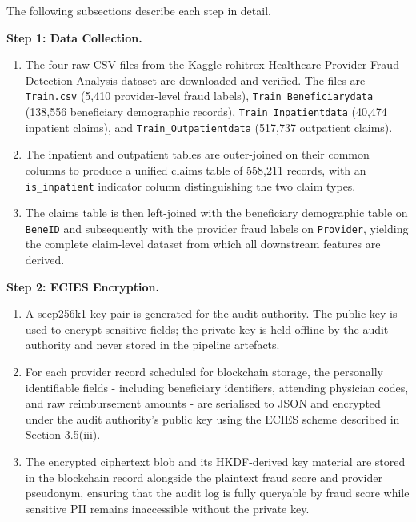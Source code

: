\noindent The following subsections describe each step in detail.

\vspace{0.5em}
\noindent\textbf{Step 1: Data Collection.}

\begin{enumerate}[label=\roman*.]
  \item The four raw CSV files from the Kaggle rohitrox Healthcare Provider Fraud
  Detection Analysis dataset are downloaded and verified. The files are
  \texttt{Train.csv} (5,410 provider-level fraud labels),
  \texttt{Train\_Beneficiarydata} (138,556 beneficiary demographic records),
  \texttt{Train\_Inpatientdata} (40,474 inpatient claims), and
  \texttt{Train\_Outpatientdata} (517,737 outpatient claims).
  \item The inpatient and outpatient tables are outer-joined on their common
  columns to produce a unified claims table of 558,211 records, with an
  \texttt{is\_inpatient} indicator column distinguishing the two claim types.
  \item The claims table is then left-joined with the beneficiary demographic
  table on \texttt{BeneID} and subsequently with the provider fraud labels on
  \texttt{Provider}, yielding the complete claim-level dataset from which all
  downstream features are derived.
\end{enumerate}

\vspace{0.5em}
\noindent\textbf{Step 2: ECIES Encryption.}

\begin{enumerate}[label=\roman*.]
  \item A secp256k1 key pair is generated for the audit authority. The public key
  is used to encrypt sensitive fields; the private key is held offline by the
  audit authority and never stored in the pipeline artefacts.
  \item For each provider record scheduled for blockchain storage, the personally
  identifiable fields - including beneficiary identifiers, attending physician
  codes, and raw reimbursement amounts - are serialised to JSON and encrypted
  under the audit authority's public key using the ECIES scheme described in
  Section 3.5(iii).
  \item The encrypted ciphertext blob and its HKDF-derived key material are stored
  in the blockchain record alongside the plaintext fraud score and provider
  pseudonym, ensuring that the audit log is fully queryable by fraud score while
  sensitive PII remains inaccessible without the private key.
\end{enumerate}


